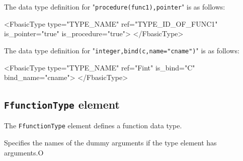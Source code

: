The data type definition for "{\tt procedure(func1),pointer}" is as follows:
\vspace{2mm}

\begin{XcodeMLFExample}
<FbasicType type="TYPE_NAME" ref="TYPE_ID_OF_FUNC1" is_pointer="true"
 is_procedure="true">
</FbasicType>
\end{XcodeMLFExample}

The data type definition for "{\tt integer,bind(c,name="cname")}" is as follows:
\vspace{2mm}

\begin{XcodeMLFExample}
<FbasicType type="TYPE_NAME" ref="Fint" is_bind="C" bind_name="cname">
</FbasicType>
\end{XcodeMLFExample}


\subsection{ {\tt FfunctionType} element}

The {\tt FfunctionType} element defines a function data type.


\begin{XcodeMLChildElements}
{Specifies the names of the dummy arguments if the type element has arguments.}{O}
\end{XcodeMLChildElements}

